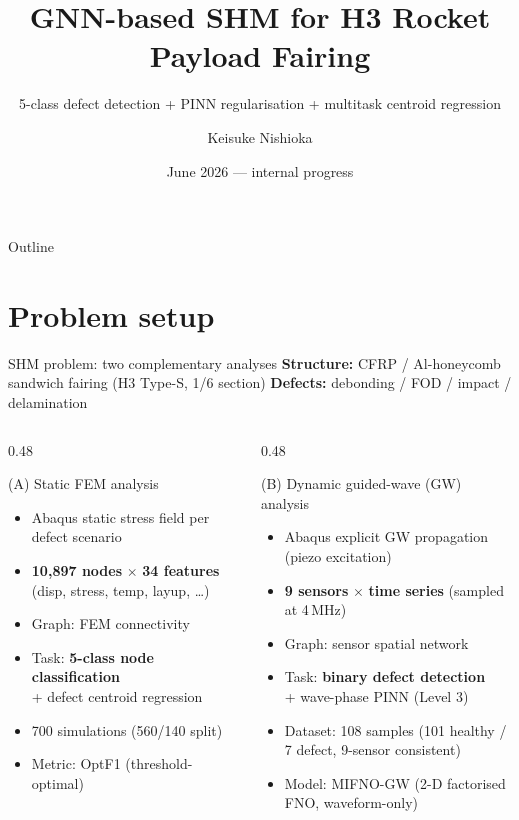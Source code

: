 \documentclass[aspectratio=169, 10pt]{beamer}
\title{GNN-based SHM for H3 Rocket Payload Fairing}
\subtitle{5-class defect detection + PINN regularisation + multitask centroid regression}
\author{Keisuke Nishioka}
\institute{Institut für Kontinuumsmechanik, LUH}
\date{June 2026 — internal progress}
\begin{document}
\maketitle

\begin{frame}{Outline}
\tableofcontents
\end{frame}

\section{Problem setup}

\begin{frame}{SHM problem: two complementary analyses}
\textbf{Structure:} CFRP / Al-honeycomb sandwich fairing (H3 Type-S, 1/6 section) \quad
\textbf{Defects:} debonding / FOD / impact / delamination

\vspace{0.4em}
\begin{columns}[T]
\begin{column}{0.48\textwidth}
\begin{block}{(A) Static FEM analysis}
\begin{itemize}\setlength\itemsep{1pt}
  \item Abaqus static stress field per defect scenario
  \item \textbf{10{,}897 nodes} $\times$ \textbf{34 features} (disp, stress, temp, layup, \ldots)
  \item Graph: FEM connectivity
  \item Task: \textbf{5-class node classification}\\
        + defect centroid regression
  \item 700 simulations (560/140 split)
  \item Metric: OptF1 (threshold-optimal)
\end{itemize}
\end{block}
\end{column}
\begin{column}{0.48\textwidth}
\begin{block}{(B) Dynamic guided-wave (GW) analysis}
\begin{itemize}\setlength\itemsep{1pt}
  \item Abaqus explicit GW propagation (piezo excitation)
  \item \textbf{9 sensors} $\times$ \textbf{time series} (sampled at 4\,MHz)
  \item Graph: sensor spatial network
  \item Task: \textbf{binary defect detection}\\
        + wave-phase PINN (Level 3)
  \item Dataset: 108 samples (101 healthy / 7 defect, 9-sensor consistent)
  \item Model: MIFNO-GW (2-D factorised FNO, waveform-only)
\end{itemize}
\end{block}
\end{column}
\end{columns}


\end{frame}
\end{document}
